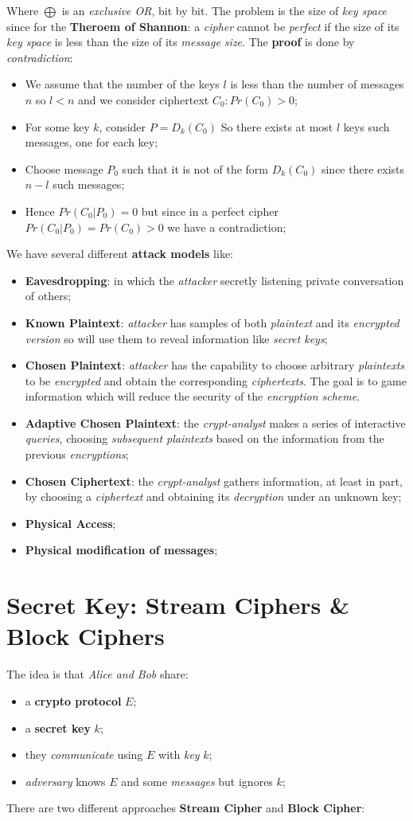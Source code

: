 \documentclass{article}
\begin{document}
Where $\bigoplus$ is an \emph{exclusive OR}, bit by bit. The problem is the size of \emph{key space} since for the \textbf{Theroem of Shannon}: a \emph{cipher} cannot be \emph{perfect} if the size of its \emph{key space} is less than the size of its \emph{message size}. 
\clearpage
The \textbf{proof} is done by \emph{contradiction}:
\begin{itemize}
\item We assume that the number of the keys $l$ is less than the number of messages $n$ so $l<n$ and we consider ciphertext $C_0: Pr(C_0) >0$;
\item For some key $k$, consider $P=D_k(C_0)$ So there exists at most $l$ keys such messages, one for each key;
\item Choose message $P_0$ such that it is not of the form $D_k(C_0)$ since there exists $n-l$ such messages;
\item Hence $Pr(C_0|P_0) = 0$ but since in a perfect cipher $Pr(C_0|P_0) = Pr(C_0) > 0$ we have a contradiction;
\end{itemize}
We have several different \textbf{attack models} like:
\begin{itemize}
\item \textbf{Eavesdropping}: in which the \emph{attacker} secretly listening private conversation of others;
\item \textbf{Known Plaintext}: \emph{attacker} has samples of both \emph{plaintext} and its \emph{encrypted version} so will use them to reveal information like \emph{secret keys};
\item \textbf{Chosen Plaintext}: \emph{attacker} has the capability to choose arbitrary \emph{plaintexts} to be \emph{encrypted} and obtain the corresponding \emph{ciphertexts}. The goal is to game information which will reduce the security of the \emph{encryption scheme}. 
\item \textbf{Adaptive Chosen Plaintext}: the \emph{crypt-analyst} makes a series of interactive \emph{queries}, choosing \emph{subsequent plaintexts} based on the information from the previous \emph{encryptions};
\item \textbf{Chosen Ciphertext}: the \emph{crypt-analyst} gathers information, at least in part, by choosing a \emph{ciphertext} and obtaining its \emph{decryption} under an unknown key;
\item \textbf{Physical Access};
\item \textbf{Physical modification of messages};
\end{itemize}
\section{Secret Key: Stream Ciphers \& Block Ciphers}
The idea is that \emph{Alice and Bob} share:
\begin{itemize}
\item a \textbf{crypto protocol} $E$;
\item a \textbf{secret key} $k$;
\item they \emph{communicate} using $E$ with \emph{key} $k$;
\item \emph{adversary} knows $E$ and some \emph{messages} but ignores $k$;
\end{itemize}
There are two different approaches \textbf{Stream Cipher} and \textbf{Block Cipher}:
\end{document}
